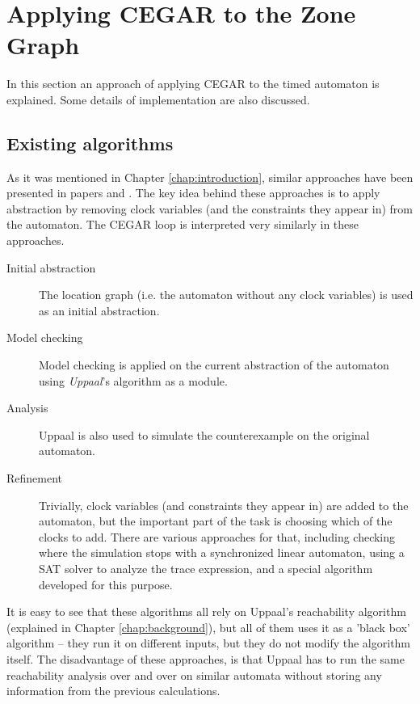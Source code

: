 \chapter{Applying CEGAR to the Zone Graph} \label{chap:timed_cegar}

In this section an approach of applying CEGAR to the timed
automaton is explained. Some details of implementation are also
discussed.

\section{Existing algorithms}
  
 As it was mentioned in Chapter \ref{chap:introduction}, similar approaches have been presented in papers \cite{dierks2007automatic, he2010compositional} and \cite{okano2011clock}. The key idea behind these approaches
 is to apply abstraction by removing clock variables (and the constraints they appear in) from the automaton. The CEGAR loop is interpreted very similarly in these approaches.
 
 \begin{description}
 	\item[Initial abstraction] The location graph (i.e. the automaton without any clock variables) is used as an initial abstraction.
 	\item[Model checking] Model checking is applied on the current abstraction of the automaton using \emph{Uppaal}'s algorithm as a module.
 	\item[Analysis] Uppaal is also used to simulate the counterexample on the original automaton.
 	\item[Refinement] Trivially, clock variables (and constraints they appear in) are added to the automaton, but the important part of the task is choosing which of the clocks to add. There are various approaches for that, including checking where the simulation stops with a synchronized linear automaton, using a SAT solver to analyze the trace expression, and a special algorithm developed for this purpose.
 \end{description}
 
 It is easy to see that these algorithms all rely on Uppaal's reachability algorithm (explained in Chapter \ref{chap:background}), but all of them uses it as a 'black box' algorithm -- they run it on different inputs, but they do not modify the algorithm itself. The disadvantage of these approaches, is that Uppaal has to run the same reachability analysis over and over on similar automata without storing any information from the previous calculations.
 
